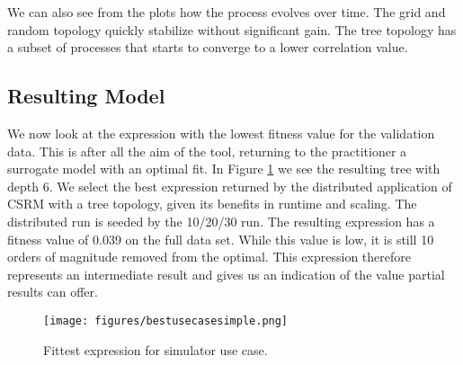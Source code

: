 We can also see from the plots how the process evolves over time. The grid and random topology quickly stabilize without significant gain. The tree topology has a subset of processes that starts to converge to a lower correlation value. 

\subsection{Resulting Model}
We now look at the expression with the lowest fitness value for the validation data. This is after all the aim of the tool, returning to the practitioner a surrogate model with an optimal fit. In Figure \ref{fig:bestusecase} we see the resulting tree with depth 6. We select the best expression returned by the distributed application of CSRM with a tree topology, given its benefits in runtime and scaling. The distributed run is seeded by the 10/20/30 run. The resulting expression has a fitness value of 0.039 on the full data set. While this value is low, it is still 10 orders of magnitude removed from the optimal. This expression therefore represents an intermediate result and gives us an indication of the value partial results can offer.
\begin{figure}
    \centering
    \texttt{[image: figures/bestusecasesimple.png]}
    \caption{Fittest expression for simulator use case.}
    \label{fig:bestusecase}
\end{figure}
